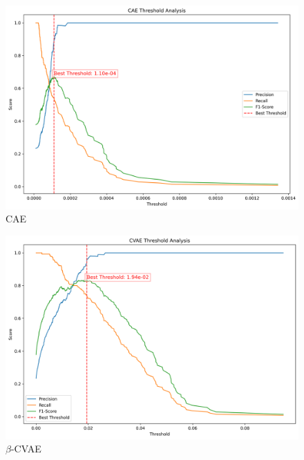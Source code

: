 \begin{figure}[!h]
  \centering
  \includegraphics[scale=0.5]{figures/anomalies/cae/threshold.png}
  \caption{CAE}
  \label{fig:threshold_cae}
\end{figure}

\begin{figure}[!h]
  \centering
  \includegraphics[scale=0.5]{figures/anomalies/cvae/threshold.png}
  \caption{$\beta$-CVAE}
  \label{fig:threshold_vae}
\end{figure}